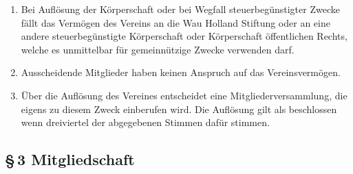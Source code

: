 \documentclass[12pt,a4paper]{article}
\begin{document}
\begin{enumerate}
\item Bei Auflösung der Körperschaft oder bei Wegfall steuerbegünstigter Zwecke fällt das Vermögen des Vereins an die Wau Holland Stiftung oder an eine andere steuerbegünstigte Körperschaft oder Körperschaft öffentlichen Rechts, welche es unmittelbar für gemeinnützige Zwecke verwenden darf. 
\item Ausscheidende Mitglieder haben keinen Anspruch auf das Vereinsvermögen. 
\item Über die Auflösung des Vereines entscheidet eine Mitgliederversammlung, die eigens zu diesem Zweck einberufen wird. Die Auflösung gilt als beschlossen wenn dreiviertel der abgegebenen Stimmen dafür stimmen. 
\end{enumerate}

\subsection*{§\,3 Mitgliedschaft}
\end{document}
